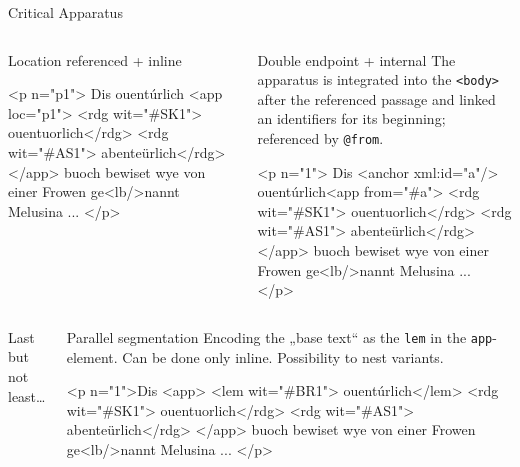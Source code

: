 \begin{frame}{Critical Apparatus}
\begin{columns}
\end{columns}

\framebreak

\begin{columns}
\begin{block}{Location referenced + inline}
\begin{xmlcode}
<p n="p1">
    Dis ouentúrlich
    <app loc="p1">
        <rdg wit="#SK1">
           ouentuorlich</rdg>
        <rdg wit="#AS1">
           abenteürlich</rdg>
    </app>
    buoch bewiset wye 
    von einer Frowen 
    ge<lb/>nannt Melusina ...
</p>
\end{xmlcode}
\end{block}


\begin{block}{Double endpoint + internal}\footnotesize
The apparatus is integrated into the \texttt{<body>} after the referenced passage and linked an identifiers for its beginning; referenced by \texttt{@from}.

\begin{xmlcode}
<p n="1">
    Dis <anchor xml:id="a"/>
    ouentúrlich<app from="#a">
        <rdg wit="#SK1">
           ouentuorlich</rdg>
        <rdg wit="#AS1">
           abenteürlich</rdg>
    </app>
    buoch bewiset wye von einer 
    Frowen ge<lb/>nannt Melusina
    ...
</p>
\end{xmlcode}
\end{block}
\end{columns}

\framebreak


\begin{columns}
Last but not least\dots
\begin{block}{Parallel segmentation}\footnotesize
Encoding the „base text“ as the \texttt{lem} in the \texttt{app}-element. Can be done only inline. Possibility to nest variants.

\begin{xmlcode}
<p n="1">Dis
    <app>
        <lem wit="#BR1">
           ouentúrlich</lem>
        <rdg wit="#SK1">
           ouentuorlich</rdg>
        <rdg wit="#AS1">
           abenteürlich</rdg>
    </app>
    buoch bewiset wye von einer 
    Frowen ge<lb/>nannt Melusina
    ...
</p>
\end{xmlcode}
\end{block}


\end{columns}
\end{frame}

